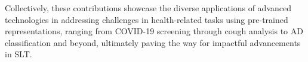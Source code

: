 Collectively, these contributions showcase the diverse applications of advanced technologies in addressing challenges in health-related tasks using pre-trained representations, ranging from COVID-19 screening through cough analysis to \ac{AD} classification and beyond, ultimately paving the way for impactful advancements in SLT. 